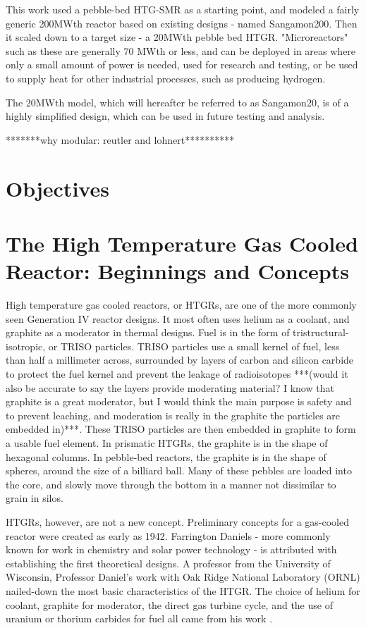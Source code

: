 This work used a pebble-bed HTG-SMR as a starting point, and modeled a fairly generic 200MWth reactor based on existing designs - named Sangamon200. Then it scaled down to a target size - a 20MWth pebble bed HTGR.  "Microreactors" such as these are generally 70 MWth or less, and can be deployed in areas where only a small amount of power is needed, used for research and testing, or be used to supply heat for other industrial processes, such as producing hydrogen.

The 20MWth model, which will hereafter be referred to as Sangamon20, is of a highly simplified design, which can be used in future testing and analysis.

*******why modular: reutler and lohnert**********

\section{Objectives}


\section{The High Temperature Gas Cooled Reactor: Beginnings and Concepts}

High temperature gas cooled reactors, or HTGRs, are one of the more commonly seen Generation IV reactor designs.  It most often uses helium as a coolant, and graphite as a moderator in thermal designs.  Fuel is in the form of tristructural-isotropic, or TRISO particles.  TRISO particles use a small kernel of fuel, less than half a millimeter across, surrounded by layers of carbon and silicon carbide to protect the fuel kernel and prevent the leakage of radioisotopes ***(would it also be accurate to say the layers provide moderating material?  I know that graphite is a great moderator, but I would think the main purpose is safety and to prevent leaching, and moderation is really in the graphite the particles are embedded in)***.  These TRISO particles are then embedded in graphite to form a usable fuel element.  In prismatic HTGRs, the graphite is in the shape of hexagonal columns.  In pebble-bed reactors, the graphite is in the shape of spheres, around the size of a billiard ball.  Many of these pebbles are loaded into the core, and slowly move through the bottom in a manner not dissimilar to grain in silos.

HTGRs, however, are not a new concept.  Preliminary concepts for a gas-cooled reactor were created as early as 1942.  Farrington Daniels - more commonly known for work in chemistry and solar power technology - is attributed with establishing the first theoretical designs.  A professor from the University of Wisconsin, Professor Daniel's work with Oak Ridge National Laboratory (ORNL) nailed-down the most basic characteristics of the HTGR.  The choice of helium for coolant, graphite for moderator, the direct gas turbine cycle, and the use of uranium or thorium carbides for fuel all came from his work \cite{simnad_early_1991}.

